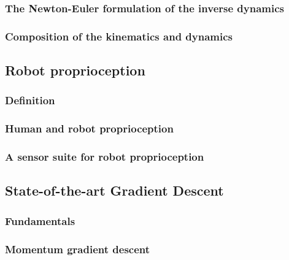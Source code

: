\documentclass{article}
\begin{document}
\subsubsection{The Newton-Euler formulation of the inverse dynamics}
\subsubsection{Composition of the kinematics and dynamics}
\subsection{Robot proprioception}
\subsubsection{Definition}
\subsubsection{Human and robot proprioception}
\subsubsection{A sensor suite for robot proprioception}
\subsection{State-of-the-art Gradient Descent}
\subsubsection{Fundamentals}
\subsubsection{Momentum gradient descent}
\end{document}
